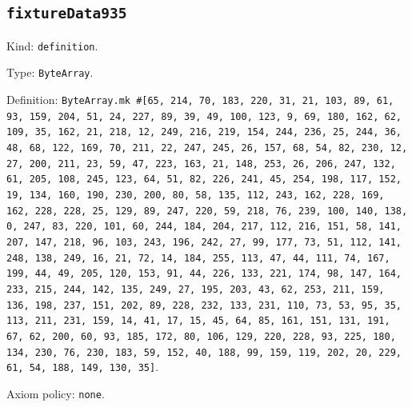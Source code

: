 \documentclass[11pt]{article}
\begin{document}
\subsection*{\texttt{fixtureData935}}
\noindent Kind: \texttt{definition}.\par
\noindent Type: \texttt{ByteArray}.\par
\noindent Definition: \texttt{ByteArray.mk \#[65, 214, 70, 183, 220, 31, 21, 103, 89, 61, 93, 159, 204, 51, 24, 227, 89, 39, 49, 100, 123, 9, 69, 180, 162, 62, 109, 35, 162, 21, 218, 12, 249, 216, 219, 154, 244, 236, 25, 244, 36, 48, 68, 122, 169, 70, 211, 22, 247, 245, 26, 157, 68, 54, 82, 230, 12, 27, 200, 211, 23, 59, 47, 223, 163, 21, 148, 253, 26, 206, 247, 132, 61, 205, 108, 245, 123, 64, 51, 82, 226, 241, 45, 254, 198, 117, 152, 19, 134, 160, 190, 230, 200, 80, 58, 135, 112, 243, 162, 228, 169, 162, 228, 228, 25, 129, 89, 247, 220, 59, 218, 76, 239, 100, 140, 138, 0, 247, 83, 220, 101, 60, 244, 184, 204, 217, 112, 216, 151, 58, 141, 207, 147, 218, 96, 103, 243, 196, 242, 27, 99, 177, 73, 51, 112, 141, 248, 138, 249, 16, 21, 72, 14, 184, 255, 113, 47, 44, 111, 74, 167, 199, 44, 49, 205, 120, 153, 91, 44, 226, 133, 221, 174, 98, 147, 164, 233, 215, 244, 142, 135, 249, 27, 195, 203, 43, 62, 253, 211, 159, 136, 198, 237, 151, 202, 89, 228, 232, 133, 231, 110, 73, 53, 95, 35, 113, 211, 231, 159, 14, 41, 17, 15, 45, 64, 85, 161, 151, 131, 191, 67, 62, 200, 60, 93, 185, 172, 80, 106, 129, 220, 228, 93, 225, 180, 134, 230, 76, 230, 183, 59, 152, 40, 188, 99, 159, 119, 202, 20, 229, 61, 54, 188, 149, 130, 35]}.\par
\noindent Axiom policy: \texttt{none}.\par
\end{document}
